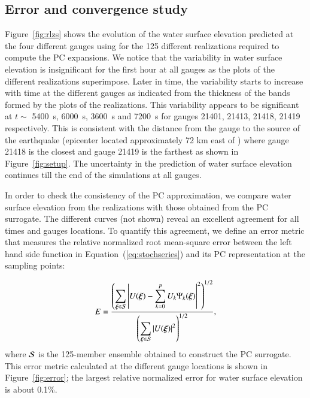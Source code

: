 \subsection{Error and convergence study}
\label{sec:analysis}

Figure~\ref{fig:rlzs} shows the evolution of the
water surface elevation predicted at the four different gauges 
using \geoclaw for the 125 different realizations 
required to compute the PC expansions. We notice that the 
variability in water surface elevation is insignificant for the first 
hour at all gauges as the plots of the different realizations superimpose.
Later in time, the variability starts to increase with time at the different gauges 
as indicated from the thickness of the bands formed by the plots of the realizations.
This variability appears to be significant at $t\sim$ 5400~s, 6000~s, 3600~s and 7200~s
for gauges 21401, 21413, 21418, 21419 respectively.
This is consistent with the distance from the gauge to the source of the earthquake
(epicenter located approximately 72 km east of \tohoku) where gauge 21418 is the closest and gauge 21419 is the farthest as shown in Figure~\ref{fig:setup}.
The uncertainty in the prediction of water surface  elevation continues till the end of the simulations
at all gauges.

In order to check the consistency of the PC approximation, we compare
water surface elevation from the realizations 
with those obtained from the PC surrogate. The different curves (not shown) 
reveal an excellent agreement for all times and gauges locations.
To quantify this agreement, we define
an error metric that measures the relative normalized root mean-square error between the left hand side function 
in Equation~(\ref{eq:stochseries}) and its PC representation at the sampling points:

\begin{equation} 
   E = \frac{\displaystyle
         \left(\sum_{\xxi \in \NISP} \left|U(\xxi) - \sum_{k = 0}^{P}
U_k\Psi_k(\xxi)\right|^2
         \right)^{1/2}}
        {\displaystyle
          \left(\sum_{\xxi \in \NISP} \left|U(\xxi)\right|^2\right)^{1/2} 
          },
\label{eq:error}
\end{equation}
where $\mathcal{S}$ is the 125-member ensemble obtained to construct the PC surrogate. 
This error metric calculated at the different gauge locations is shown in Figure~\ref{fig:error};
the largest relative normalized error for 
water surface elevation is about 0.1\%. 


